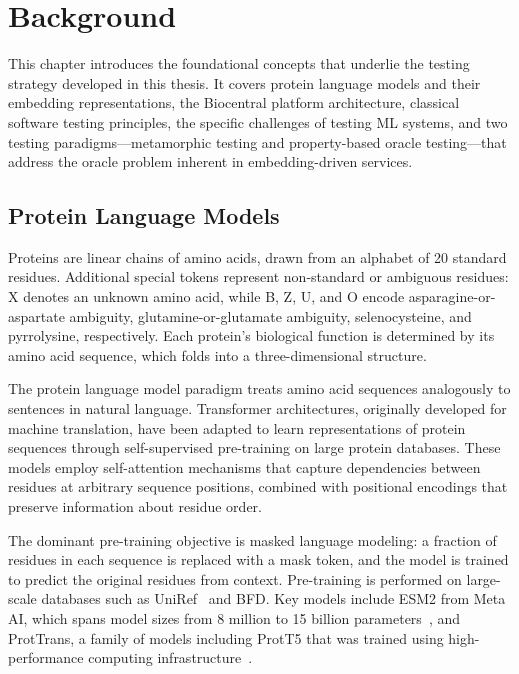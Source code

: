 
\chapter{Background}\label{chapter:background}

This chapter introduces the foundational concepts that underlie the testing strategy developed in this thesis. It covers protein language models and their embedding representations, the Biocentral platform architecture, classical software testing principles, the specific challenges of testing \ac{ML} systems, and two testing paradigms---metamorphic testing and property-based oracle testing---that address the oracle problem inherent in embedding-driven services.

\section{Protein Language Models}\label{sec:plms}

Proteins are linear chains of amino acids, drawn from an alphabet of 20 standard residues. Additional special tokens represent non-standard or ambiguous residues: X denotes an unknown amino acid, while B, Z, U, and O encode asparagine-or-aspartate ambiguity, glutamine-or-glutamate ambiguity, selenocysteine, and pyrrolysine, respectively. Each protein's biological function is determined by its amino acid sequence, which folds into a three-dimensional structure.

The protein language model paradigm treats amino acid sequences analogously to sentences in natural language. Transformer architectures, originally developed for machine translation, have been adapted to learn representations of protein sequences through self-supervised pre-training on large protein databases. These models employ self-attention mechanisms that capture dependencies between residues at arbitrary sequence positions, combined with positional encodings that preserve information about residue order.

The dominant pre-training objective is masked language modeling: a fraction of residues in each sequence is replaced with a mask token, and the model is trained to predict the original residues from context. Pre-training is performed on large-scale databases such as UniRef~\cite{suzek2015uniref} and BFD. Key models include ESM2 from Meta AI, which spans model sizes from 8 million to 15 billion parameters~\cite{lin2023evolutionary}, and ProtTrans, a family of models including ProtT5 that was trained using high-performance computing infrastructure~\cite{elnaggar2021prottranscrackinglanguagelifes}.


